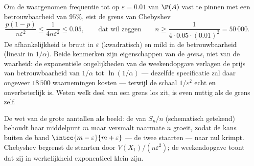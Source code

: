 \begin{example}\label{ex:b2:randomvar:llnnumeric}
Om de waargenomen frequentie tot op $\varepsilon = 0.01$ van
$\P(A)$ vast te pinnen met een betrouwbaarheid van $95\%$, eist de
grens van Chebyshev
\[
\frac{p(1-p)}{n\varepsilon^2} \leq \frac{1}{4n\varepsilon^2}
\leq 0.05,
\qquad\text{dat wil zeggen}\qquad
n \geq \frac{1}{4\cdot0.05\cdot(0.01)^2} = 50\,000 .
\]
De afhankelijkheid is bruut in $\varepsilon$ (kwadratisch) en mild
in de betrouwbaarheid (lineair in $1/\alpha$). Beide kenmerken zijn
eigenschappen van de \emph{grens}, niet van de waarheid: de
exponentiële ongelijkheden van de weekendopgave verlagen de prijs
van betrouwbaarheid van $1/\alpha$ tot $\ln(1/\alpha)$ ---
dezelfde specificatie zal daar ongeveer $18\,500$ waarnemingen
kosten --- terwijl de schaal $1/\varepsilon^2$ echt en
onverbeterlijk is. Weten welk deel van een grens los zit, is even
nuttig als de grens zelf.
\end{example}

\begin{omfigure}

{\small De wet van de grote aantallen als beeld: de  van
$S_n/n$ (schematisch getekend) behoudt haar middelpunt $m$ maar
versmalt naarmate $n$ groeit, zodat de kans buiten de band
$\intcc{m-\varepsilon}{m+\varepsilon}$ --- de twee staarten ---
naar nul krimpt. Chebyshev begrenst de staarten door
$V(X_1)/(n\varepsilon^2)$; de weekendopgave toont dat zij in
werkelijkheid exponentieel klein zijn.}
\end{omfigure}

